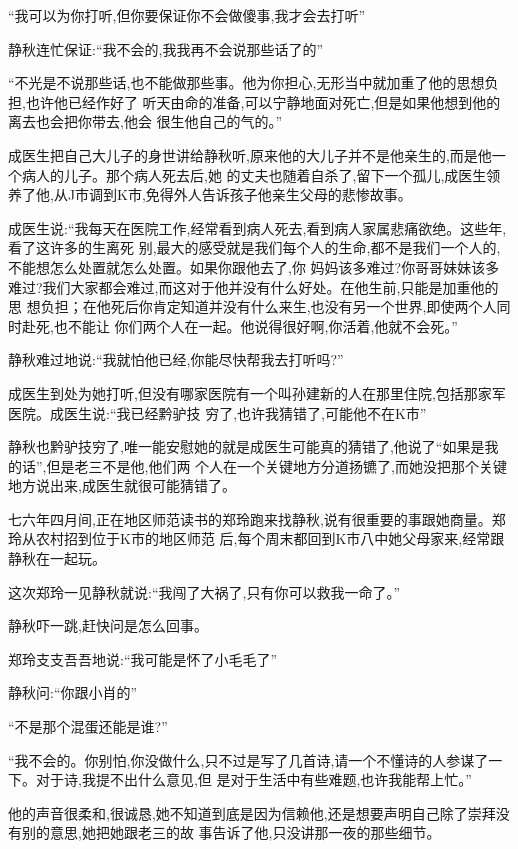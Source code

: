 ﻿\documentclass[12pt]{article}
\begin{document}
``我可以为你打听,但你\myrule 要保证你不会\myrule 做傻事,我才会去打听\myrule ''

静秋连忙保证:``我不会的,我\myrule 我\myrule 再不会说那些话了的\myrule ''

``不光是不说那些话,也不能做那些事。他为你担心,无形当中就加重了他的思想负担,也许他\myrule 已经作好了
\myrule 听天由命的准备,可以宁静地面对\myrule 死亡,但是如果他想到他的离去也会把你带\myrule 去,他会
\myrule 很生他自己的气的。''

成医生把自己大儿子的身世讲给静秋听,原来他的大儿子并不是他亲生的,而是他一个病人的儿子。那个病人死去后,她
的丈夫也随着自杀了,留下一个孤儿,成医生领养了他,从J市调到K市,免得外人告诉孩子他亲生父母的悲惨故事。

成医生说:``我每天在医院工作,经常看到病人\myrule 死去,看到病人家属悲痛欲绝。这些年,看了这许多的生离死
别,最大的感受就是我们每个人的生命,都不是我们一个人的,不能想怎么处置就怎么处置。如果你\myrule 跟他去了,你
妈妈该多难过?你哥哥妹妹该多难过?我们大家都会难过,而这对于他并没有什么好处。在他生前,只能是加重他的思
想负担；在他死后\myrule 你肯定知道并没有什么来生,也没有另一个世界,即使两个人同时赴死,也不能\myrule 让
你们两个人在一起。他说得很好啊,你活着,他就不会死。''

静秋难过地说:``我就怕\myrule 他已经\myrule ,你能尽快帮我去打听吗?''

成医生到处为她打听,但没有哪家医院有一个叫孙建新的人在那里住院,包括那家军医院。成医生说:``我已经黔驴技
穷了,也许我猜错了,可能他不在K市\myrule ''

静秋也黔驴技穷了,唯一能安慰她的就是成医生可能真的猜错了,他说了``如果是我的话'',但是老三不是他,他们两
个人在一个关键地方分道扬镳了,而她没把那个关键地方说出来,成医生就很可能猜错了。

七六年四月间,正在地区师范读书的郑玲跑来找静秋,说有很重要的事跟她商量。郑玲从农村招到位于K市的地区师范
后,每个周末都回到K市八中她父母家来,经常跟静秋在一起玩。

这次郑玲一见静秋就说:``我闯了大祸了,只有你可以救我一命了。''

静秋吓一跳,赶快问是怎么回事。

郑玲支支吾吾地说:``我\myrule 可能是\myrule 怀了小毛毛了\myrule ''

静秋问:``你\myrule 跟\myrule 小肖的\myrule ''

``不是那个混蛋还能是谁?''
 
``我不会的。你别怕,你没做什么,只不过是写了几首诗,请一个不懂诗的人参谋了一下。对于诗,我提不出什么意见,但
是对于生活中有些难题,也许我能帮上忙。''

他的声音很柔和,很诚恳,她不知道到底是因为信赖他,还是想要声明自己除了崇拜没有别的意思,她把她跟老三的故
事告诉了他,只没讲那一夜的那些细节。
\end{document}
